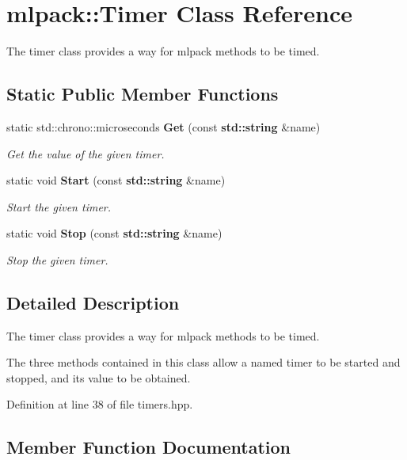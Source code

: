 \section{mlpack\+:\+:Timer Class Reference}
\label{classmlpack_1_1Timer}


The timer class provides a way for mlpack methods to be timed.  


\subsection*{Static Public Member Functions}
\begin{DoxyCompactItemize}
\item 
static std\+::chrono\+::microseconds {\bf Get} (const {\bf std\+::string} \&name)
\begin{DoxyCompactList}\small\item\em Get the value of the given timer. \end{DoxyCompactList}\item 
static void {\bf Start} (const {\bf std\+::string} \&name)
\begin{DoxyCompactList}\small\item\em Start the given timer. \end{DoxyCompactList}\item 
static void {\bf Stop} (const {\bf std\+::string} \&name)
\begin{DoxyCompactList}\small\item\em Stop the given timer. \end{DoxyCompactList}\end{DoxyCompactItemize}


\subsection{Detailed Description}
The timer class provides a way for mlpack methods to be timed. 

The three methods contained in this class allow a named timer to be started and stopped, and its value to be obtained. 

Definition at line 38 of file timers.\+hpp.



\subsection{Member Function Documentation}
